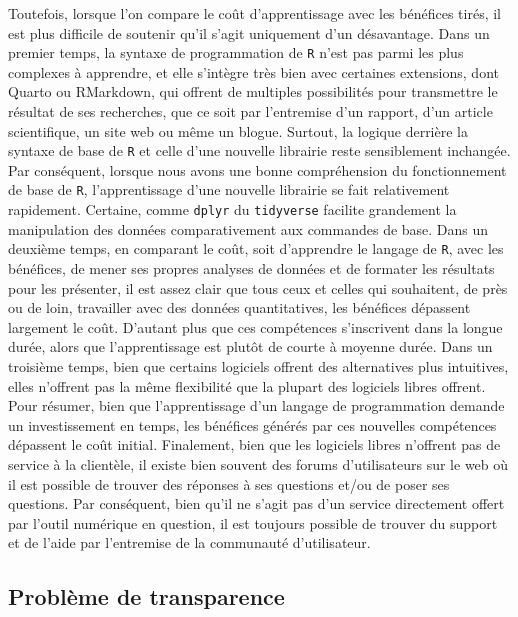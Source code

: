 \documentclass[
  letterpaper,
  DIV=11,
  numbers=noendperiod]{scrreprt}
\begin{document}
Toutefois, lorsque l'on compare le coût d'apprentissage avec les
bénéfices tirés, il est plus difficile de soutenir qu'il s'agit
uniquement d'un désavantage. Dans un premier temps, la syntaxe de
programmation de \texttt{R} n'est pas parmi les plus complexes à
apprendre, et elle s'intègre très bien avec certaines extensions, dont
Quarto ou RMarkdown, qui offrent de multiples possibilités pour
transmettre le résultat de ses recherches, que ce soit par l'entremise
d'un rapport, d'un article scientifique, un site web ou même un blogue.
Surtout, la logique derrière la syntaxe de base de \texttt{R} et celle
d'une nouvelle librairie reste sensiblement inchangée. Par conséquent,
lorsque nous avons une bonne compréhension du fonctionnement de base de
\texttt{R}, l'apprentissage d'une nouvelle librairie se fait
relativement rapidement. Certaine, comme \texttt{dplyr} du
\texttt{tidyverse} facilite grandement la manipulation des données
comparativement aux commandes de base. Dans un deuxième temps, en
comparant le coût, soit d'apprendre le langage de \texttt{R}, avec les
bénéfices, de mener ses propres analyses de données et de formater les
résultats pour les présenter, il est assez clair que tous ceux et celles
qui souhaitent, de près ou de loin, travailler avec des données
quantitatives, les bénéfices dépassent largement le coût. D'autant plus
que ces compétences s'inscrivent dans la longue durée, alors que
l'apprentissage est plutôt de courte à moyenne durée. Dans un troisième
temps, bien que certains logiciels offrent des alternatives plus
intuitives, elles n'offrent pas la même flexibilité que la plupart des
logiciels libres offrent. Pour résumer, bien que l'apprentissage d'un
langage de programmation demande un investissement en temps, les
bénéfices générés par ces nouvelles compétences dépassent le coût
initial. Finalement, bien que les logiciels libres n'offrent pas de
service à la clientèle, il existe bien souvent des forums d'utilisateurs
sur le web où il est possible de trouver des réponses à ses questions
et/ou de poser ses questions. Par conséquent, bien qu'il ne s'agit pas
d'un service directement offert par l'outil numérique en question, il
est toujours possible de trouver du support et de l'aide par l'entremise
de la communauté d'utilisateur.

\hypertarget{probluxe8me-de-transparence}{%
\subsection{Problème de
transparence}\label{probluxe8me-de-transparence}}
\end{document}
